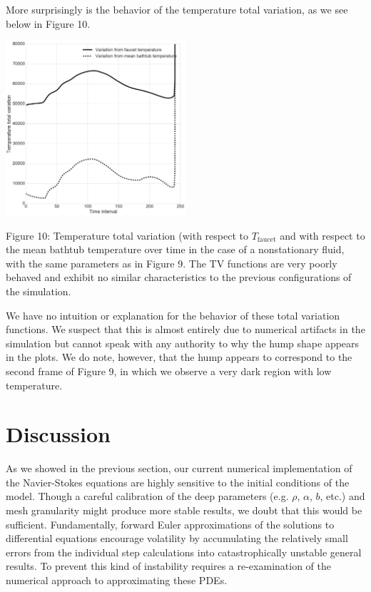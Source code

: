 \documentclass[12pt]{amsart}
\begin{document}
More surprisingly is the behavior of the temperature total variation, as we see
below in Figure 10.
\begin{center}
    \includegraphics[width=0.5\textwidth]{../plots/tv-05.png}

    \justify
    \footnotesize{
        Figure 10: Temperature total variation (with respect to
        $T_{\mathrm{faucet}}$ and with respect to the mean bathtub temperature
        over time in the case of a nonstationary fluid, with the same parameters
        as in Figure 9. The TV functions are very poorly behaved and exhibit no
        similar characteristics to the previous configurations of the
        simulation.}
\end{center}
We have no intuition or explanation for the behavior of these total variation
functions. We suspect that this is almost entirely due to numerical artifacts in
the simulation but cannot speak with any authority to why the hump shape appears
in the plots. We do note, however, that the hump appears to correspond to the
second frame of Figure 9, in which we observe a very dark region with low
temperature. 




\section{Discussion}

As we showed in the previous section, our current numerical implementation of
the Navier-Stokes equations are highly sensitive to the initial conditions of
the model. Though a careful calibration of the deep parameters (e.g. $\rho$,
$\alpha$, $b$, etc.) and mesh granularity might produce more stable results,
we doubt that this would be sufficient. Fundamentally, forward Euler
approximations of the solutions to differential equations encourage volatility 
by accumulating the relatively small errors from the individual step
calculations into catastrophically unstable general results. To prevent this
kind of instability requires a re-examination of the numerical approach to
approximating these PDEs.
\end{document}
